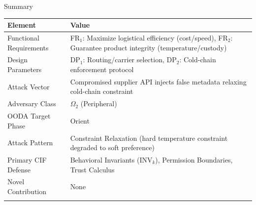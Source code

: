 \documentclass[
  ignorenonframetext,
]{beamer}
\newcounter{none} %
\begin{document}
\begin{frame}[allowframebreaks]{Summary}
\protect{}\label{summary}
{\def\LTcaptype{none} %
\begin{longtable}[]{@{}
  >{\raggedright\arraybackslash}p{}
  >{\raggedright\arraybackslash}p{}@{}}
\toprule\noalign{}
\begin{minipage}[b]{\linewidth}\raggedright
Element
\end{minipage} & \begin{minipage}[b]{\linewidth}\raggedright
Value
\end{minipage} \\
\midrule\noalign{}
\endhead
Functional Requirements & FR\(_1\): Maximize logistical efficiency
(cost/speed), FR\(_2\): Guarantee product integrity
(temperature/custody) \\
Design Parameters & DP\(_1\): Routing/carrier selection, DP\(_2\):
Cold-chain enforcement protocol \\
Attack Vector & Compromised supplier API injects false metadata relaxing
cold-chain constraint \\
Adversary Class & \(\Omega_2\) (Peripheral) \\
OODA Target Phase & Orient \\
Attack Pattern & Constraint Relaxation (hard temperature constraint
degraded to soft preference) \\
Primary CIF Defense & Behavioral Invariants (\(\text{INV}_k\)),
Permission Boundaries, Trust Calculus \\
Novel Contribution & None \\
\bottomrule\noalign{}
\end{longtable}
}
\end{frame}
\end{document}
